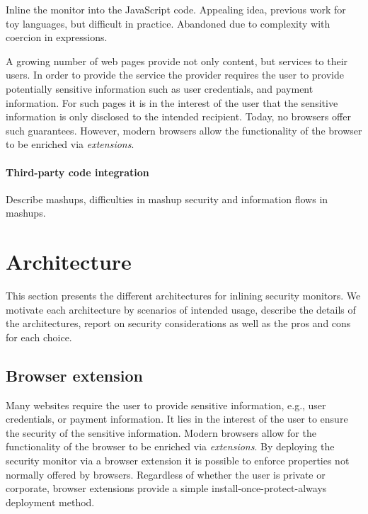\documentclass{llncs}
\begin{document}
Inline the monitor into the JavaScript code. Appealing idea, previous work for 
toy languages, but difficult in practice. Abandoned due to complexity with 
coercion in expressions.


A growing number of web pages provide not only content, but services to their
users. In order to provide the service the provider requires the user to
provide potentially sensitive information such as user credentials, and payment
information. For such pages it is in the interest of the user that the
sensitive information is only disclosed to the intended recipient.  Today, no
browsers offer such guarantees. However, modern browsers allow the
functionality of the browser to be enriched via \emph{extensions}. 


\paragraph{Third-party code integration}

Describe mashups, difficulties in mashup security and information flows in mashups.

\section{Architecture}
\label{sec:arch}

This section presents the different architectures for inlining
security monitors. We motivate each architecture by scenarios of
intended usage, describe the details of the architectures, report on
security considerations as well as the pros and cons for each choice.




\subsection{Browser extension}

Many websites require the user to provide sensitive information, e.g., user
credentials, or payment information. It lies in the interest of the user to
ensure the security of the sensitive information.  Modern browsers allow for
the functionality of the browser to be enriched via \emph{extensions}. By
deploying the security monitor via a browser extension it is possible to enforce
properties not normally offered by browsers.  Regardless of whether the user is
private or corporate, browser extensions provide a simple 
install-once-protect-always deployment method.
\end{document}
